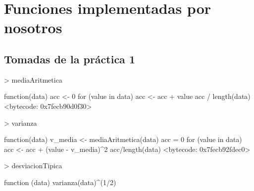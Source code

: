 \documentclass [a4paper] {article}
\begin{document}
\newpage
\section{Funciones implementadas por nosotros}
\subsection{Tomadas de la práctica 1}
\begin{Schunk}
\begin{Sinput}
> mediaAritmetica
\end{Sinput}
\begin{Soutput}
function(data){
  acc <- 0
  for (value in data) {
    acc <- acc + value
  }
  acc / length(data)
}
<bytecode: 0x7fecb90d0f30>
\end{Soutput}
\begin{Sinput}
> varianza
\end{Sinput}
\begin{Soutput}
function(data) {
  v_media <- mediaAritmetica(data)
  acc = 0
  for (value in data){
    acc <- acc + (value - v_media)^2
  }
  acc/length(data)
}
<bytecode: 0x7fecb92fdec0>
\end{Soutput}
\begin{Sinput}
> desviacionTipica
\end{Sinput}
\begin{Soutput}
function (data) {
  varianza(data)^(1/2)
}
\end{Soutput}
\end{Schunk}
\end{document}
